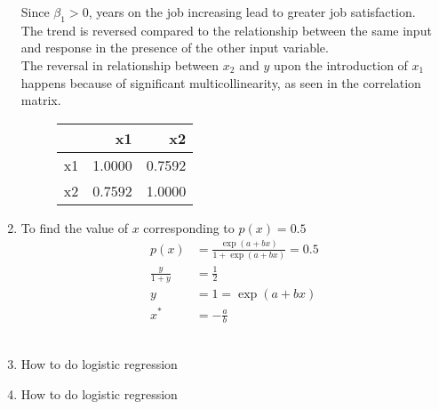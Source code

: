 \begin{enumerate}
Since $ \beta_1  > 0$, years on the job increasing lead to greater job satisfaction.\\

The trend is reversed compared to the relationship between the same input and response in the presence of the other input variable.\\

The reversal in relationship between $ x_2 $ and $ y $ upon the introduction of $ x_1 $ happens because of significant multicollinearity, as seen in the correlation matrix.\\

\begin{figure}[H]
	\centering
	\renewcommand{\arraystretch}{2}
\begin{tabular}{lrr}
	\toprule
	{} &      x1 &       x2 \\
	\midrule
	x1 &  1.0000 &  0.7592 \\
	x2  &  0.7592 &  1.0000 \\
	\bottomrule
\end{tabular}
\end{figure}


\item To find the value of $ x $ corresponding to $ p(x) = 0.5 $\\

\begin{align}
	p(x) &= \frac{\exp(a + bx)}{1 + \exp(a + bx)} = 0.5 \nonumber \\
	\frac{y}{1 + y} &= \frac{1}{2} \nonumber \\
	y &= 1 = \exp (a + bx) \nonumber \\
	x^* &= -\frac{a}{b}
\end{align}\\

\item How to do logistic regression

\item How to do logistic regression



\end{enumerate}

